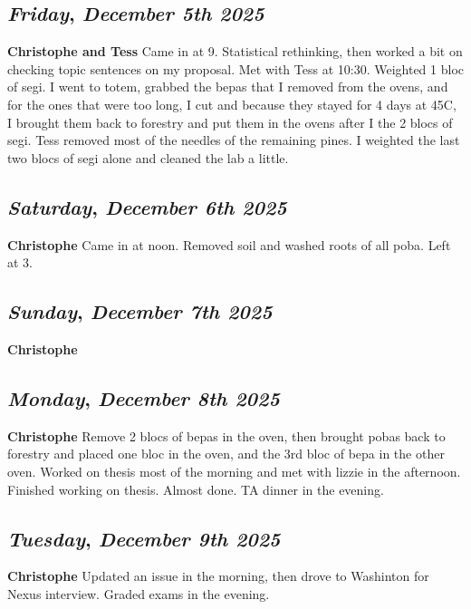 \def\day{\textit{December 5th 2025}}
\def\weekday{\textit{Friday}}
\subsection*{\weekday, \day}
\textbf {Christophe and Tess}
Came in at 9. Statistical rethinking, then worked a bit on checking topic sentences on my proposal. Met with Tess at 10:30. Weighted 1 bloc of segi. I went to totem, grabbed the bepas that I removed from the ovens, and for the ones that were too long, I cut and because they stayed for 4 days at 45C, I brought them back to forestry and put them in the ovens after I the 2 blocs of segi. Tess removed most of the needles of the remaining pines. I weighted the last two blocs of segi alone and cleaned the lab a little. 

\def\day{\textit{December 6th 2025}}
\def\weekday{\textit{Saturday}}
\subsection*{\weekday, \day}
\textbf {Christophe}
Came in at noon. Removed soil and washed roots of all poba. Left at 3.

\def\day{\textit{December 7th 2025}}
\def\weekday{\textit{Sunday}}
\subsection*{\weekday, \day}
\textbf {Christophe}

\def\day{\textit{December 8th 2025}}
\def\weekday{\textit{Monday}}
\subsection*{\weekday, \day}
\textbf {Christophe}
Remove 2 blocs of bepas in the oven, then brought pobas back to forestry and placed one bloc in the oven, and the 3rd bloc of bepa in the other oven. Worked on thesis most of the morning and met with lizzie in the afternoon. Finished working on thesis. Almost done. TA dinner in the evening.

\def\day{\textit{December 9th 2025}}
\def\weekday{\textit{Tuesday}}
\subsection*{\weekday, \day}
\textbf {Christophe}
Updated an issue in the morning, then drove to Washinton for Nexus interview. Graded exams in the evening. 

\def\day{\textit{December 10th 2025}}
\def\weekday{\textit{Wednesday}}

